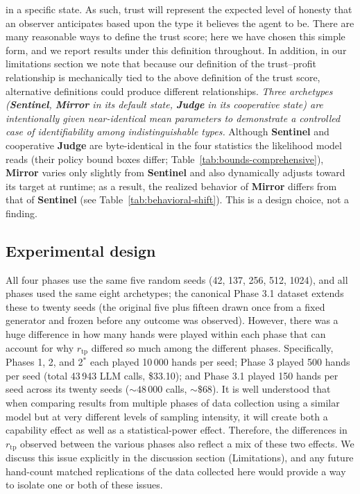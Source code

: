 \documentclass[10pt]{article} %
\newcommand{\arch}[1]{\textbf{#1}}
\newcommand{\rtp}{\ensuremath{r_{\mathrm{tp}}}}
\begin{document}
in a specific state. As such, trust will represent the expected level
of honesty that an observer anticipates based upon the type it
believes the agent to be. There are many reasonable ways to define the trust score;
here we have chosen this simple form, and we report results under
this definition throughout. In addition, in our
limitations section we note that because our definition of the
trust--profit relationship is mechanically tied to the above
definition of the trust score, alternative definitions could
produce different relationships. \textit{Three archetypes
(\arch{Sentinel}, \arch{Mirror} in its default state, \arch{Judge}
in its cooperative state) are intentionally given near-identical mean
parameters to demonstrate a controlled case of identifiability among
indistinguishable types.} Although \arch{Sentinel} and cooperative \arch{Judge} are byte-identical
in the four statistics the likelihood model reads (their policy bound boxes
differ; Table~\ref{tab:bounds-comprehensive}), \arch{Mirror} varies only slightly from \arch{Sentinel} and also dynamically
adjusts toward its target at runtime; as a result, the realized
behavior of \arch{Mirror} differs from that of \arch{Sentinel}
(see Table~\ref{tab:behavioral-shift}).
This is a design choice, not a finding.

\subsection{Experimental design}
All four phases use the same five random seeds (42, 137, 256, 512, 1024), and all phases used the same eight archetypes; the canonical Phase 3.1 dataset extends these to twenty seeds (the original five plus fifteen drawn once from a fixed generator and frozen before any outcome was observed). However, there
was a huge difference in how many hands were played within each
phase that can account for why $\rtp$ differed so much among the
different phases. Specifically, Phases 1, 2, and 2$^{*}$ each played
10\,000 hands per seed; Phase 3 played 500 hands per seed (total
43\,943 LLM calls, \$33.10); and Phase 3.1 played 150 hands per seed across its twenty seeds (${\sim}48\,000$ calls, ${\sim}\$68$). It is well understood that when
comparing results from multiple phases of data collection using a
similar model but at very different levels of sampling intensity, it
will create both a capability effect as well as a statistical-power
effect. Therefore, the differences in $\rtp$ observed between the
various phases also reflect a mix of these two effects. We discuss
this issue explicitly in the discussion section (Limitations), and
any future hand-count matched replications of the data collected
here would provide a way to isolate one or both of these issues.
\end{document}
